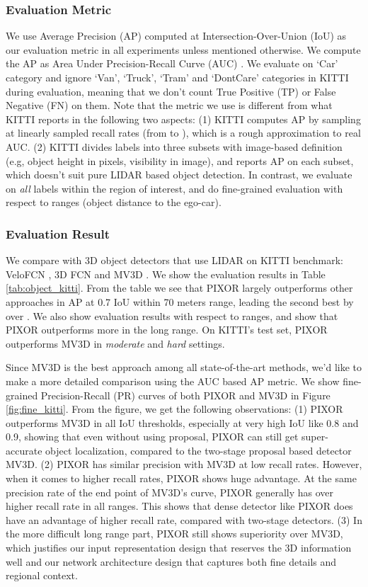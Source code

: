 \vspace{-0.2cm}
\subsubsection{Evaluation Metric}
We use Average Precision (AP) computed at  Intersection-Over-Union (IoU) as our evaluation metric in all experiments unless mentioned otherwise. We compute the AP as Area Under Precision-Recall Curve (AUC) \cite{pascal}. We evaluate on `Car' category and ignore `Van', `Truck', `Tram' and `DontCare' categories in KITTI during evaluation, meaning that we don't count True Positive (TP) or False Negative (FN) on them. Note that the metric we use is different from what KITTI reports in the following two aspects: (1) KITTI computes AP by sampling at  linearly sampled recall rates (from  to ), which is a rough approximation to real AUC. (2) KITTI divides labels into three subsets with image-based definition (e.g, object height in pixels, visibility in image), and reports AP on each subset, which doesn't suit pure LIDAR based object detection. In contrast, we evaluate on {\it all} labels within the region of interest, and do fine-grained evaluation with respect to ranges (object distance to the ego-car).

\vspace{-0.2cm}
\subsubsection{Evaluation Result}
We compare with 3D object detectors that use LIDAR on KITTI benchmark: VeloFCN \cite{velofcn}, 3D FCN \cite{3dfcn} and MV3D \cite{mv3d}. We show the evaluation results in Table \ref{tab:object_kitti}. From the table we see that PIXOR largely outperforms other approaches in AP at 0.7 IoU within 70 meters range, leading the second best by over . We also show evaluation results with respect to ranges, and show that PIXOR outperforms more in the long range. On KITTI's test set, PIXOR outperforms MV3D in {\it moderate} and {\it hard} settings.

Since MV3D is the best approach among all state-of-the-art methods, we'd like to make a more detailed comparison using the AUC based AP metric. We show fine-grained Precision-Recall (PR) curves of both PIXOR and MV3D in Figure \ref{fig:fine_kitti}. From the figure, we get the following observations: (1) PIXOR outperforms MV3D in all IoU thresholds, especially at very high IoU like 0.8 and 0.9, showing that even without using proposal, PIXOR can still get super-accurate object localization, compared to the two-stage proposal based detector MV3D. (2) PIXOR has similar precision with MV3D at low recall rates. However, when it comes to higher recall rates, PIXOR shows huge advantage. At the same precision rate of the end point of MV3D's curve, PIXOR generally has over  higher recall rate in all ranges. This shows that dense detector like PIXOR does have an advantage of higher recall rate, compared with two-stage detectors. (3) In the more difficult long range part, PIXOR still shows superiority over MV3D, which justifies our input representation design that reserves the 3D information well and our network architecture design that captures both fine details and regional context.


